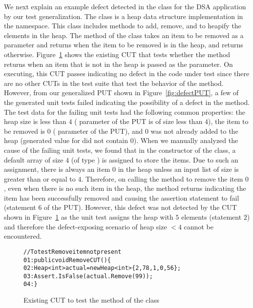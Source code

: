 We next explain an example defect detected in the  class for the DSA application by our test generalization. The  class is a heap data structure implementation in the  namespace. This class includes methods to add, remove, and to heapify the elements in the heap. The  method of the class takes an item to be removed as a parameter and returns  when the item to be removed is in the heap, and returns  otherwise. Figure~\ref{fig:defectCUT} shows the existing CUT that tests whether the  method returns  when an item that is not in the heap is passed as the parameter. On executing, this CUT passes indicating no defect in the code under test since there are no other CUTs in the test suite that test the behavior of the method. However, from our generalized PUT shown in Figure~\ref{fig:defectPUT}, a few of the generated unit tests failed indicating the possibility of a defect in the  method. The test data for the failing unit tests had the following common properties: the heap size is less than $4$ ( parameter of the PUT is of size less than $4$), the item to be removed is $0$ ( parameter of the PUT), and $0$ was not already added to the heap (generated value for  did not contain $0$). When we manually analyzed the cause of the failing unit tests, we found that in the constructor of the  class, a default array of size $4$ (of type ) is assigned to store the items. Due to such an assignment, there is always an item $0$ in the heap unless an input list of size is greater than or equal to $4$. Therefore, on calling the  method to remove the item $0$, even when there is no such item in the heap, the method returns  indicating the item has been successfully removed and causing the assertion statement to fail (statement $6$ of the PUT). However, this defect was not detected by the CUT shown in Figure~\ref{fig:defectCUT} as the unit test assigns the heap with $5$ elements (statement $2$) and therefore the defect-exposing scenario of heap size $< 4$ cannot be encountered. 

\begin{figure}[t]
\begin{CodeOut}
\begin{alltt}
//To test Remove item not present
01: public void RemoveCUT()\{
02: \hspace*{0.07in}Heap<int> actual = new Heap<int> \{2, 78, 1, 0, 56\};
03: \hspace*{0.07in}Assert.IsFalse(actual.Remove(99));
04: \hspace*{0.02in}\}
\end{alltt}
\end{CodeOut}
\caption{Existing CUT to test the  method of the  class}
\label{fig:defectCUT}
\end{figure}


